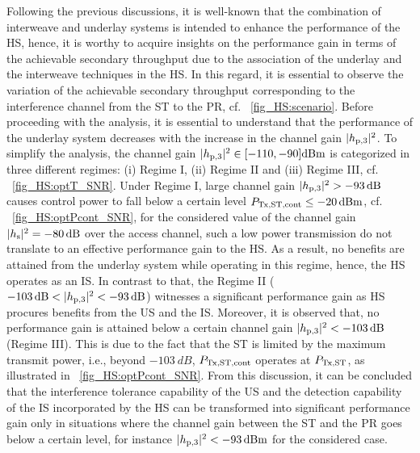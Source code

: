 Following the previous discussions, it is well-known that the combination of interweave and underlay systems is intended to enhance the performance of the HS, hence, it is worthy to acquire insights on the performance gain in terms of the achievable secondary throughput due to the association of the underlay and the interweave techniques in the HS. In this regard, it is essential to observe the variation of the achievable secondary throughput corresponding to the interference channel from the ST to the PR, cf. \figurename~\ref{fig_HS:scenario}. Before proceeding with the analysis, it is essential to understand that the performance of the underlay system decreases with the increase in the channel gain $|h_{\text{p,3}}|^2$. To simplify the analysis, the channel gain $|h_{\text{p,3}}|^2 \in [-110, -90] \SI{}{dBm}$ is categorized in three different regimes: (i) Regime I, (ii) Regime II and (iii) Regime III, cf. \figurename~\ref{fig_HS:optT_SNR}. Under Regime I, large channel gain $|h_{\text{p,3}}|^2 > -\SI{93}{dB}$ causes control power to fall below a certain level $P_{\text{Tx,ST,cont}} \le \SI{-20}{dBm}$, cf. \figurename~\ref{fig_HS:optPcont_SNR}, for the considered value of the channel gain $|h_{\text{s}}|^2 = \SI{-80}{dB}$ over the access channel, such a low power transmission do not translate to an effective performance gain to the HS. As a result, no benefits are attained from the underlay system while operating in this regime, hence, the HS operates as an IS. In contrast to that, the Regime II ($-\SI{103}{dB} < |h_{\text{p,3}}|^2 < -\SI{93}{dB}$) witnesses a significant performance gain as HS procures benefits from the US and the IS. Moreover, it is observed that, no performance gain is attained below a certain channel gain $|h_{\text{p,3}}|^2 < \SI{-103}{dB}$ (Regime III). This is due to the fact that the ST is limited by the maximum transmit power, i.e., beyond $\SI{-103}{dB}$, $P_{\text{Tx,ST,cont}}$ operates at $P_{\text{Tx,ST}}$, as illustrated in \figurename~\ref{fig_HS:optPcont_SNR}. From this discussion, it can be concluded that the interference tolerance capability of the US and the detection capability of the IS incorporated by the HS can be transformed into significant performance gain only in situations where the channel gain between the ST and the PR goes below a certain level, for instance $|h_{\text{p,3}}|^2 < -\SI{93}{dBm}$ for the considered case.



